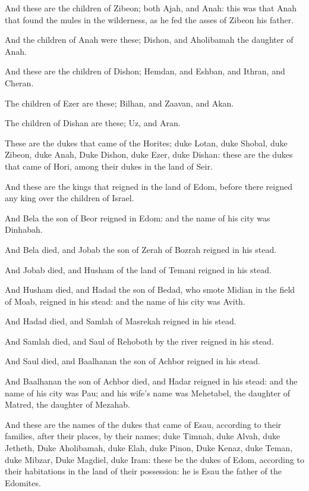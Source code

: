 \Verse And these are the children of Zibeon; both Ajah, and Anah: this was that Anah that found the mules in the wilderness, as he fed the asses of Zibeon his father.

\Verse And the children of Anah were these; Dishon, and Aholibamah the daughter of Anah.

\Verse And these are the children of Dishon; Hemdan, and Eshban, and Ithran, and Cheran.

\Verse The children of Ezer are these; Bilhan, and Zaavan, and Akan.

\Verse The children of Dishan are these; Uz, and Aran.

\Verse These are the dukes that came of the Horites; duke Lotan, duke Shobal, duke Zibeon, duke Anah, \Verse Duke Dishon, duke Ezer, duke Dishan: these are the dukes that came of Hori, among their dukes in the land of Seir.

\Verse And these are the kings that reigned in the land of Edom, before there reigned any king over the children of Israel.

\Verse And Bela the son of Beor reigned in Edom: and the name of his city was Dinhabah.

\Verse And Bela died, and Jobab the son of Zerah of Bozrah reigned in his stead.

\Verse And Jobab died, and Husham of the land of Temani reigned in his stead.

\Verse And Husham died, and Hadad the son of Bedad, who smote Midian in the field of Moab, reigned in his stead: and the name of his city was Avith.

\Verse And Hadad died, and Samlah of Masrekah reigned in his stead.

\Verse And Samlah died, and Saul of Rehoboth by the river reigned in his stead.

\Verse And Saul died, and Baalhanan the son of Achbor reigned in his stead.

\Verse And Baalhanan the son of Achbor died, and Hadar reigned in his stead: and the name of his city was Pau; and his wife's name was Mehetabel, the daughter of Matred, the daughter of Mezahab.

\Verse And these are the names of the dukes that came of Esau, according to their families, after their places, by their names; duke Timnah, duke Alvah, duke Jetheth, \Verse Duke Aholibamah, duke Elah, duke Pinon, \Verse Duke Kenaz, duke Teman, duke Mibzar, \Verse Duke Magdiel, duke Iram: these be the dukes of Edom, according to their habitations in the land of their possession: he is Esau the father of the Edomites.

